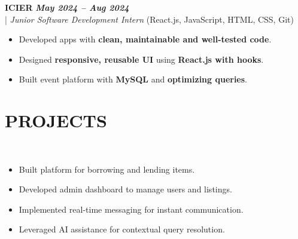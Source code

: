 \documentclass[10pt,a4paper]{article}
\begin{document}
\vspace{5pt}
\noindent
   \textbf{ICIER} \hfill \textit{\textbf{May 2024 -- Aug 2024}} \\
  \;|\;
  \textit{Junior Software Development Intern} (React.js, JavaScript, HTML, CSS, Git)
  \hfill

\begin{itemize}



\item Developed apps with \textbf{clean, maintainable and well-tested code}.



\item Designed \textbf{responsive, reusable UI} using \textbf{React.js with hooks}.



\item Built event platform with \textbf{MySQL} and \textbf{optimizing queries}.



\end{itemize}
\section*{PROJECTS}
\small

\noindent
{}\\[-12pt]
\begin{itemize}

\item Built platform for borrowing and lending items.

\item Developed admin dashboard to manage users and listings.

\item Implemented real-time messaging for instant communication.

\item Leveraged AI assistance for contextual query resolution.

\end{itemize}

\noindent
{}\\[-12pt]
\end{document}
